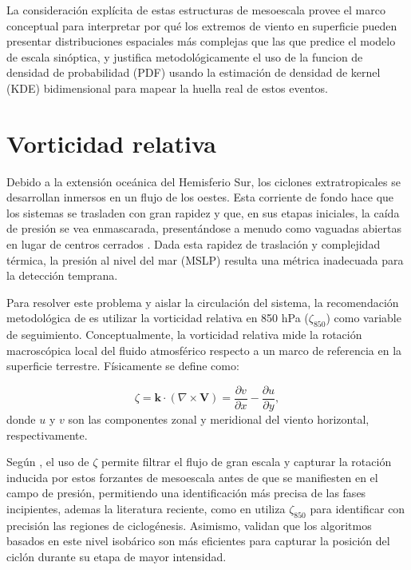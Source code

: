 La consideración explícita de estas estructuras de mesoescala provee el marco conceptual para interpretar por qué los extremos de viento en superficie pueden presentar distribuciones espaciales más complejas que las que predice el modelo de escala sinóptica, y justifica metodológicamente el uso de la funcion de densidad de probabilidad (PDF) usando la estimación de densidad de kernel (KDE) bidimensional para mapear la huella real de estos eventos.


\section{Vorticidad relativa}\label{sec:tb_vorticidad}

Debido a la extensión oceánica del Hemisferio Sur, los ciclones extratropicales se desarrollan inmersos en un flujo de los oestes. Esta corriente de fondo hace que los sistemas se trasladen con gran rapidez y que, en sus etapas iniciales, la caída de presión se vea enmascarada, presentándose a menudo como vaguadas abiertas en lugar de centros cerrados \citep{sinclair1994objective}. Dada esta rapidez de traslación y complejidad térmica, la presión al nivel del mar (MSLP) resulta una métrica inadecuada para la detección temprana. 

Para resolver este problema y aislar la circulación del sistema, la recomendación metodológica de \citet{sinclair1997objective} es utilizar la vorticidad relativa en 850 hPa ($\zeta_{850}$) como variable de seguimiento. Conceptualmente, la vorticidad relativa mide la rotación macroscópica local del fluido atmosférico respecto a un marco de referencia en la superficie terrestre. Físicamente se define como:

\begin{equation}\label{eq:vorticidad_relativa}
\zeta = \mathbf{k} \cdot (\nabla \times \mathbf{V}) = \frac{\partial v}{\partial x} - \frac{\partial u}{\partial y},
\end{equation}
donde $u$ y $v$ son las componentes zonal y meridional del viento horizontal, respectivamente.

Según \citet{hoskins2005new}, el uso de $\zeta$ permite filtrar el flujo de gran escala y capturar la rotación inducida por estos forzantes de mesoescala antes de que se manifiesten en el campo de presión, permitiendo una identificación más precisa de las fases incipientes, ademas la literatura reciente, como en \citet{gramcianinov2019properties} utiliza $\zeta_{850}$ para identificar con precisión las regiones de ciclogénesis. Asimismo, \citet{padilhareinke2024objective} validan que los algoritmos basados en este nivel isobárico son más eficientes para capturar la posición del ciclón durante su etapa de mayor intensidad. 

